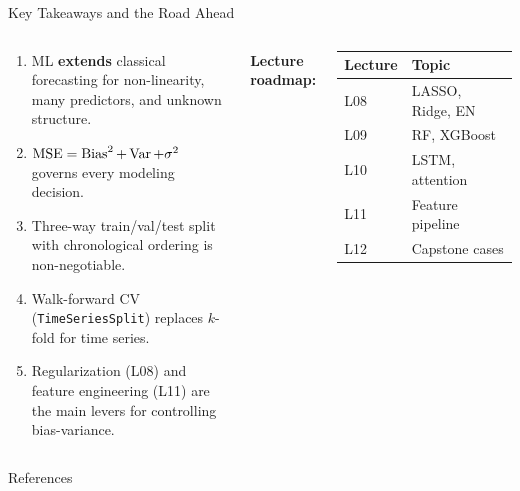 \documentclass[aspectratio=169, 11pt]{beamer}
\begin{document}
\begin{frame}{Key Takeaways and the Road Ahead}
  \begin{columns}[T]
      \begin{keybox}
        {\small
        \begin{enumerate}
          \item ML \textbf{extends} classical forecasting for
                non-linearity, many predictors, and unknown structure.
          \item $\operatorname{MSE} = \operatorname{Bias}^2 + \operatorname{Var}
                + \sigma^2$ governs every modeling decision.
          \item Three-way train/val/test split with chronological
                ordering is non-negotiable.
          \item Walk-forward CV (\texttt{TimeSeriesSplit}) replaces
                $k$-fold for time series.
          \item Regularization (L08) and feature engineering (L11)
                are the main levers for controlling bias-variance.
        \end{enumerate}
        }
      \end{keybox}
      \textbf{Lecture roadmap:}
      {\footnotesize
      \begin{tabular}{ll}
        \toprule
        \textbf{Lecture} & \textbf{Topic} \\
        \midrule
        L08 & LASSO, Ridge, EN \\
        L09 & RF, XGBoost \\
        L10 & LSTM, attention \\
        L11 & Feature pipeline \\
        L12 & Capstone cases \\
        \bottomrule
      \end{tabular}
      }
      \vspace{0.1cm}
  \end{columns}
\end{frame}

\begin{frame}[allowframebreaks]{References}
  \printbibliography[heading=none]
\end{frame}
\end{document}
